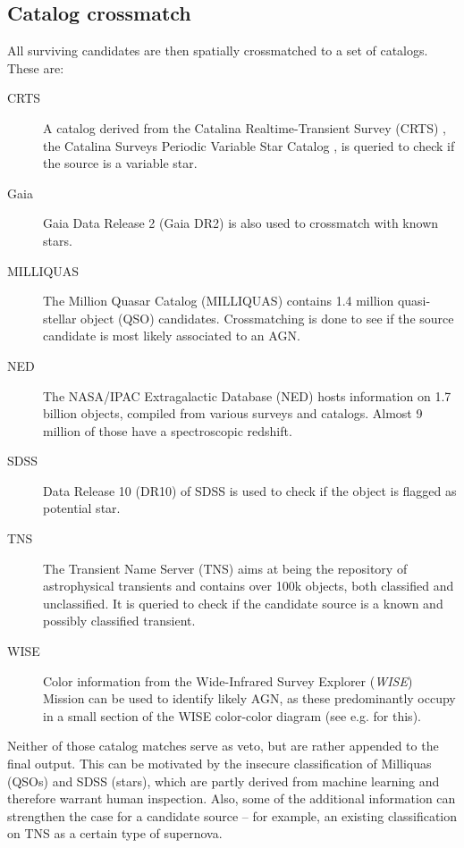 \subsection{Catalog crossmatch} \label{catmatch}
All surviving candidates are then spatially crossmatched to a set of catalogs. These are:
\begin{description}
    \item[CRTS] A catalog derived from the Catalina Realtime-Transient Survey (CRTS) , the Catalina Surveys Periodic Variable Star Catalog , is queried to check if the source is a variable star.
    \item[Gaia] Gaia Data Release 2 (Gaia DR2)  is also used to crossmatch with known stars.
    \item[MILLIQUAS] The Million Quasar Catalog (MILLIQUAS)  contains 1.4 million quasi-stellar object (QSO) candidates. Crossmatching is done to see if the source candidate is most likely associated to an AGN.
    \item[NED] The NASA/IPAC Extragalactic Database (NED) hosts information on 1.7 billion objects, compiled from various surveys and catalogs. Almost 9 million of those have a spectroscopic redshift.
    \item[SDSS] Data Release 10 (DR10)  of SDSS is used to check if the object is flagged as potential star.
    \item[TNS] The Transient Name Server (TNS) aims at being the repository of astrophysical transients and contains over 100k objects, both classified and unclassified. It is queried to check if the candidate source is a known and possibly classified transient.
    \item[WISE] Color information from the Wide-Infrared Survey Explorer (\textit{WISE}) Mission  can be used to identify likely AGN, as these predominantly occupy in a small section of the WISE color-color diagram (see e.g.  for this).
\end{description}
Neither of those catalog matches serve as veto, but are rather appended to the final output. This can be motivated by the insecure classification of Milliquas (QSOs) and SDSS (stars), which are partly derived from machine learning and therefore warrant human inspection. Also, some of the additional information can strengthen the case for a candidate source -- for example, an existing classification on TNS as a certain type of supernova. 


